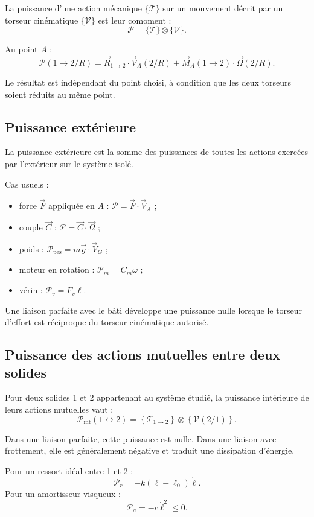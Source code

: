 La puissance d'une action mécanique $\{\mathcal T\}$ sur un mouvement décrit par un torseur cinématique $\{\mathcal V\}$ est leur comoment :
\[
\mathcal P=\{\mathcal T\}\otimes\{\mathcal V\}.
\]

Au point $A$ :
\[
\mathcal P(1\rightarrow2/R)=
\vec R_{1\rightarrow2}\cdot\vec V_A(2/R)
+\vec M_A(1\rightarrow2)\cdot\vec\Omega(2/R).
\]

Le résultat est indépendant du point choisi, à condition que les deux torseurs soient réduits au même point.

\subsection{Puissance extérieure}

La puissance extérieure est la somme des puissances de toutes les actions exercées par l'extérieur sur le système isolé.

Cas usuels :
\begin{itemize}
  \item force $\vec F$ appliquée en $A$ : $\mathcal P=\vec F\cdot\vec V_A$ ;
  \item couple $\vec C$ : $\mathcal P=\vec C\cdot\vec\Omega$ ;
  \item poids : $\mathcal P_{\mathrm{pes}}=m\vec g\cdot\vec V_G$ ;
  \item moteur en rotation : $\mathcal P_m=C_m\omega$ ;
  \item vérin : $\mathcal P_v=F_v\dot\ell$.
\end{itemize}

Une liaison parfaite avec le bâti développe une puissance nulle lorsque le torseur d'effort est réciproque du torseur cinématique autorisé.

\subsection{Puissance des actions mutuelles entre deux solides}

Pour deux solides 1 et 2 appartenant au système étudié, la puissance intérieure de leurs actions mutuelles vaut :
\[
\mathcal P_{\mathrm{int}}(1\leftrightarrow2)
=\left\{\mathcal T_{1\rightarrow2}\right\}
\otimes\left\{\mathcal V(2/1)\right\}.
\]

Dans une liaison parfaite, cette puissance est nulle. Dans une liaison avec frottement, elle est généralement négative et traduit une dissipation d'énergie.

Pour un ressort idéal entre 1 et 2 :
\[
\mathcal P_r=-k(\ell-\ell_0)\dot\ell.
\]
Pour un amortisseur visqueux :
\[
\mathcal P_a=-c\dot\ell^2\leq0.
\]

